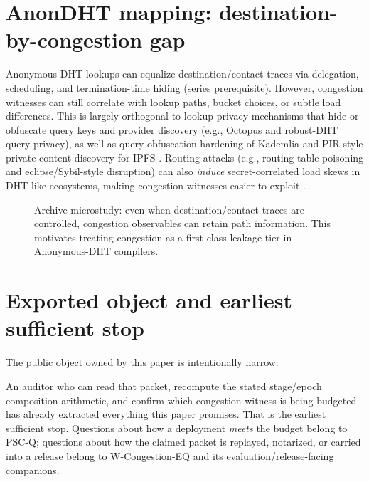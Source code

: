 \documentclass[11pt]{article}
\theoremstyle{definition}
\theoremstyle{remark}
\begin{document}
\section{AnonDHT mapping: destination-by-congestion gap}
Anonymous DHT lookups can equalize destination/contact traces via delegation, scheduling, and termination-time hiding (series prerequisite).
However, congestion witnesses can still correlate with lookup paths, bucket choices, or subtle load differences.
This is largely orthogonal to 
lookup-privacy mechanisms that hide or obfuscate query keys and provider discovery (e.g., Octopus and robust-DHT query privacy),
as well as query-obfuscation hardening of Kademlia and PIR-style private content discovery for IPFS \cite{octopus,add_query_privacy,kademlia_obfuscation,peer2pir,ipfs_triplehash}.
Routing attacks (e.g., routing-table poisoning and eclipse/Sybil-style disruption) can also \emph{induce} secret-correlated load skews in DHT-like ecosystems, making congestion witnesses easier to exploit \cite{ipfs_totaleclipse,singh_eclipse2006,wang_sybil_bittorrent2012}.

\begin{figure}[t]
\centering
{}
\caption{Archive microstudy: even when destination/contact traces are controlled, congestion observables can retain path information.
This motivates treating congestion as a first-class leakage tier in Anonymous-DHT compilers.}
\label{fig:dht}
\end{figure}

\section{Exported object and earliest sufficient stop}
The public object owned by this paper is intentionally narrow:
\begin{center}
\end{center}
An auditor who can read that packet, recompute the stated stage/epoch composition arithmetic, and confirm which congestion witness is being budgeted has already extracted everything this paper promises.
That is the earliest sufficient stop.
Questions about how a deployment \emph{meets} the budget belong to PSC-Q; questions about how the claimed packet is replayed, notarized, or carried into a release belong to W-Congestion-EQ and its evaluation/release-facing companions.\cite{series:pscq,series:wcongeq}
\end{document}
